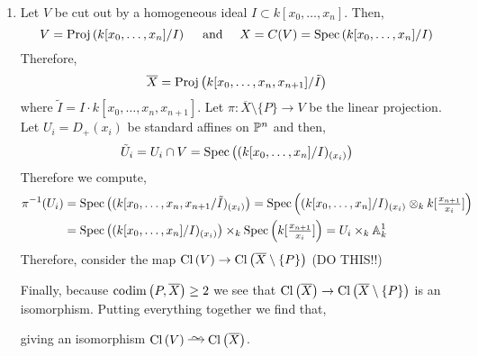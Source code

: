 \documentclass[12pt]{article}
\begin{document}
\begin{enumerate}
\item Let $V$ be cut out by a homogeneous ideal $I \subset k[x_0, \dots, x_n]$. Then,
\[ V = \Proj{k[x_0, \dots, x_n]/I} \quad \text{ and } \quad X = C(V) = \Spec{k[x_0, \dots, x_n]/I} \]
Therefore,
\[ \overline{X} = \Proj{k[x_0, \dots, x_n, x_{n+1}]/\tilde{I}} \]
where $\tilde{I} = I \cdot k[x_0, \dots, x_n, x_{n+1}]$.
Let $\pi : \overline{X} \setminus \{ P \} \to V$ be the linear projection. Let $U_i = D_{+}(x_i)$ be standard affines on $\P^n$ and then,
\[ \tilde{U}_i = U_i \cap V = \Spec{(k[x_0, \dots, x_n]/I)_{(x_i)}} \]
Therefore we compute,
\begin{align*}
\pi^{-1}(U_i) & = \Spec{(k[x_0, \dots, x_n, x_{n+1}/\tilde{I})_{(x_i)}} = \Spec{(k[x_0, \dots, x_n]/I)_{(x_i)} \otimes_k k[\tfrac{x_{n+1}}{x_i}]} 
\\
& = \Spec{(k[x_0, \dots, x_n]/I)_{(x_i)}} \times_k \Spec{k[\tfrac{x_{n+1}}{x_i}]} = U_i \times_k \A^1_k
\end{align*}
Therefore, consider the map $\Cl{V} \to \Cl{\overline{X} \setminus \{ P \}}$ (DO THIS!!)


Finally, because $\codim{P, \overline{X}} \ge 2$ we see that $\Cl{\overline{X}} \to \Cl{\overline{X} \setminus \{ P \}}$ is an isomorphism. Putting everything together we find that,
\begin{center}
\end{center}
giving an isomorphism $\Cl{V} \iso \Cl{\overline{X}}$.


\end{enumerate}
\end{document}
